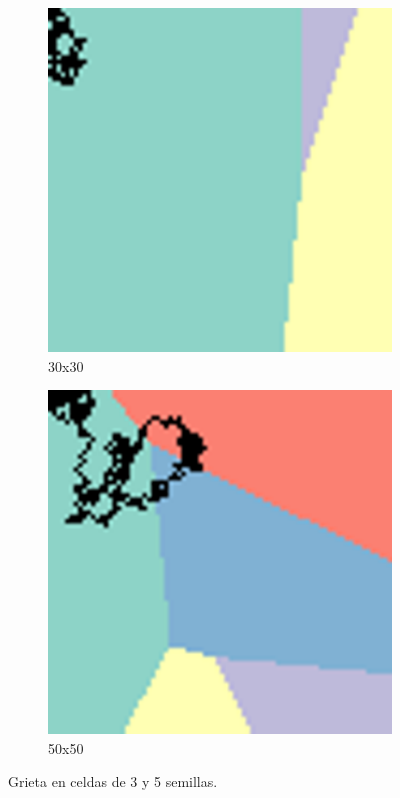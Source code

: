 \documentclass{article}
\begin{document}
\begin{figure}[H]
       \centering
       \begin{subfigure}[b]{0.45\linewidth}
           \includegraphics[width=\linewidth]{3semillas_3.png}
           \caption{30x30}
           \label{fig:westminster_lateral}
        \end{subfigure}
        \begin{subfigure}[b]{0.45\linewidth}
            \includegraphics[width=\linewidth]{5semillas_5.png}
            \caption{50x50}
            \label{fig:westminster_aerea}
        \end{subfigure}
        \caption{Grieta en celdas de 3 y 5 semillas.}
        \label{f2}
\end{figure}
\end{document}

